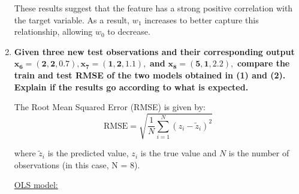 \documentclass[12pt]{article}
\begin{document}
\begin{enumerate}
    These results suggest that the feature has a strong positive correlation with the target variable. As a result, $w_1$ increases to better capture this relationship, allowing $w_0$
    to decrease.

    \vspace{10pt}
    \item \textbf{Given three new test observations and their corresponding output\\}
    $\mathbf{x_6 = (2,2,0.7), x_7 = (1,2,1.1),}$ \textbf{ and } $\mathbf{x_8 = (5,1,2.2),}$
    \textbf{compare the train and test RMSE of the two models obtained in (1) and (2). Explain if the results go according to what is expected.}    

    \vspace{10pt}
    The Root Mean Squared Error (RMSE) is given by:
    \begin{equation*}
        \text{RMSE} = \sqrt{\frac{1}{N} \sum_{i=1}^{N} (z_{i} - \tilde{z}_{i})^2}
    \end{equation*}

    where $\tilde{z}_{i}$ is the predicted value, $z_{i}$ is the true value and $N$ is the number of observations (in this case, N = 8).

    \vspace{10pt}
    \underline{OLS model:}


\end{enumerate}
\end{document}

